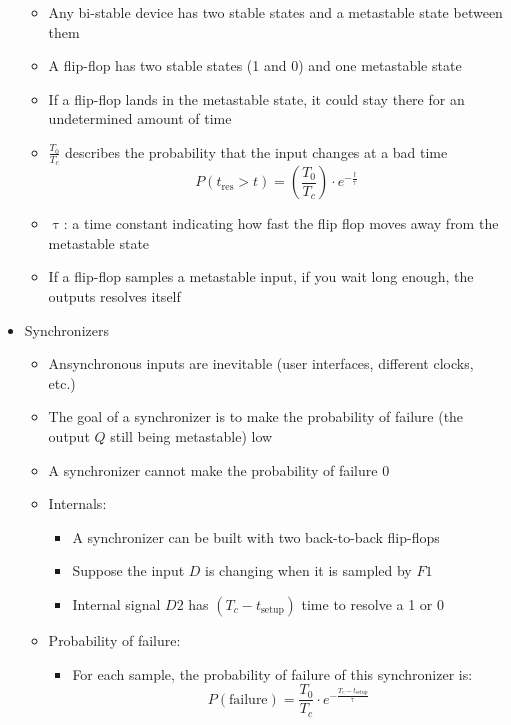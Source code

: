 \documentclass[a4paper]{article}
\begin{document}
\begin{itemize}
\begin{itemize}
\item Any bi-stable device has two stable states and a metastable state between them
\item A flip-flop has two stable states (1 and 0) and one metastable state
\item If a flip-flop lands in the metastable state, it could stay there for an undetermined amount of time
\item $\frac{T_0}{T_c}$ describes the probability that the input changes at a bad time
\[P(t_\text{res}>t)=\left( \frac{T_0}{T_c}\right)\cdot e^{-\frac{t}{\uptau}}\]
\item $\uptau$: a time constant indicating how fast the flip flop moves away from the metastable state
\item If a flip-flop samples a metastable input, if you wait long enough, the outputs resolves itself
\end{itemize}
\item Synchronizers
\begin{itemize}
\item Ansynchronous inputs are inevitable (user interfaces, different clocks, etc.)
\item The goal of a synchronizer is to make the probability of failure (the output $Q$ still being metastable) low
\item A synchronizer cannot make the probability of failure 0
\item Internals:
\begin{itemize}
\item A synchronizer can be built with two back-to-back flip-flops
\item Suppose the input $D$ is changing when it is sampled by $F1$
\item Internal signal $D2$ has $\left( T_c - t_\text{setup}\right)$ time to resolve a 1 or 0
\end{itemize}
\item Probability of failure:
\begin{itemize}
\item For each sample, the probability of failure of this synchronizer is: \[P(\text{failure})=\frac{T_0}{T_c}\cdot e^{-\frac{T_c-t_\text{setup}}{\uptau}}\]
\begin{center}

\end{center}
\end{itemize}
\end{itemize}
\end{itemize}
\end{document}
